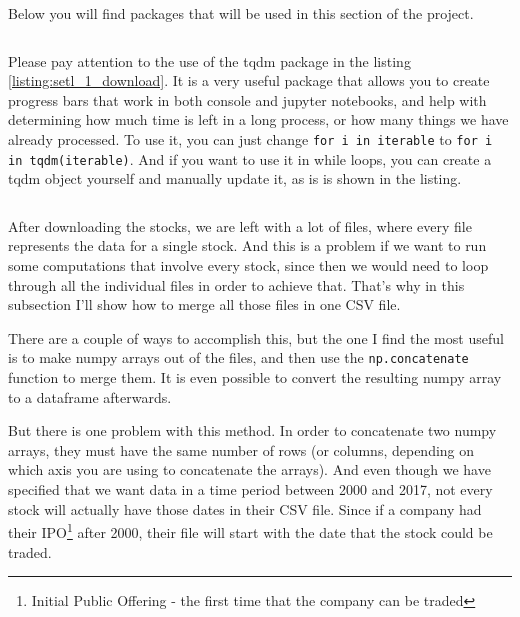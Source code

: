 \documentclass[12pt, a4paper]{article}
\begin{document}

Below you will find packages that will be used in this section of the project.

\bgroup
  \inputminted[linenos, breaklines=true, fontsize=\scriptsize, firstnumber=last]{python}{src/stocks/etl/0a_imports.py}
  \label{listing:setl_0a_imports}
\egroup



Please pay attention to the use of the tqdm package in the listing \ref{listing:setl_1_download}. It is a very useful package that allows you to create progress bars that work in both console and jupyter notebooks, and help with determining how much time is left in a long process, or how many things we have already processed. To use it, you can just change \texttt{for i in iterable} to \texttt{for i in tqdm(iterable)}. And if you want to use it in while loops, you can create a tqdm object yourself and manually update it, as is is shown in the listing.

\bgroup
  \inputminted[linenos, breaklines=true, fontsize=\scriptsize]{python}{src/stocks/etl/1_download.py}
  \label{listing:setl_1_download}
\egroup


After downloading the stocks, we are left with a lot of files, where every file represents the data for a single stock. And this is a problem if we want to run some computations that involve every stock, since then we would need to loop through all the individual files in order to achieve that. That’s why in this subsection I’ll show how to merge all those files in one CSV file.

There are a couple of ways to accomplish this, but the one I find the most useful is to make numpy arrays out of the files, and then use the \texttt{np.concatenate} function to merge them. It is even possible to convert the resulting numpy array to a dataframe afterwards.

But there is one problem with this method. In order to  concatenate two numpy arrays, they must have the same number of rows (or columns, depending on which axis you are using to concatenate the arrays). And even though we have specified that we want data in a time period between 2000 and 2017, not every stock will actually have those dates in their CSV file. Since if a company had their IPO\footnote{Initial Public Offering - the first time that the company can be traded} after 2000, their file will start with the date that the stock could be traded.
\end{document}
